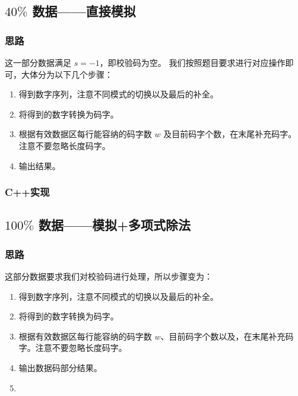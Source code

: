 
% 

\subsection{\texorpdfstring{$40\%$}{40\%} 数据——直接模拟}

\subsubsection{思路}

这一部分数据满足 $s=-1$，即校验码为空。
我们按照题目要求进行对应操作即可，大体分为以下几个步骤：

\begin{enumerate}
  \item 得到数字序列，注意不同模式的切换以及最后的补全。
  \item 将得到的数字转换为码字。
  \item 根据有效数据区每行能容纳的码字数 $w$ 及目前码字个数，在末尾补充码字。注意不要忽略长度码字。
  \item 输出结果。
\end{enumerate}

\subsubsection{C++实现}



\subsection{\texorpdfstring{$100\%$}{100\%} 数据——模拟+多项式除法}

\subsubsection{思路}

这部分数据要求我们对校验码进行处理，所以步骤变为：

\begin{enumerate}
  \item 得到数字序列，注意不同模式的切换以及最后的补全。
  \item 将得到的数字转换为码字。
  \item 根据有效数据区每行能容纳的码字数 $w$、目前码字个数以及{}，在末尾补充码字。注意不要忽略长度码字。
  \item 输出数据码部分结果。
  \item {}
\end{enumerate}

